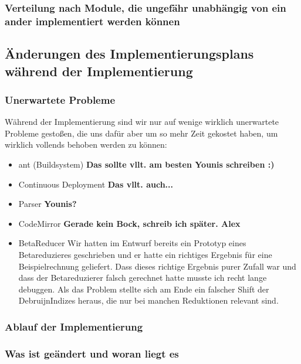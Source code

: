 \documentclass[parskip=full,11pt,twoside]{scrartcl}
\begin{document}
\subsubsection{Verteilung nach Module, die ungefähr unabhängig von ein ander implementiert werden können}

\subsection{Änderungen des Implementierungsplans während der Implementierung}

\subsubsection{Unerwartete Probleme}
Während der Implementierung sind wir nur auf wenige wirklich unerwartete Probleme gestoßen, die uns dafür aber um so mehr Zeit gekostet haben, um wirklich vollends behoben werden zu können:
\begin{itemize}
    \item ant (Buildsystem)
        \newline
        \textbf{Das sollte vllt. am besten Younis schreiben :)}
    \item Continuous Deployment
        \newline
        \textbf{Das vllt. auch...}
    \item Parser
        \newline
        \textbf{Younis?}
    \item CodeMirror
        \newline
        \textbf{Gerade kein Bock, schreib ich später. Alex}
    \item BetaReducer
    \newline
    Wir hatten im Entwurf bereits ein Prototyp eines Betareduzieres geschrieben und er hatte ein richtiges Ergebnis für eine Beispielrechnung geliefert. Dass dieses richtige Ergebnis purer Zufall war und dass der Betareduzierer falsch gerechnet hatte musste ich recht lange debuggen. Als das Problem stellte sich am Ende ein falscher Shift der DebruijnIndizes heraus, die nur bei manchen Reduktionen relevant sind.
   
\end{itemize}
\subsubsection{Ablauf der Implementierung}
\subsubsection{Was ist geändert und woran liegt es}
\end{document}

